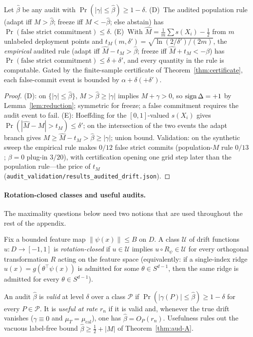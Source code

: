 \begin{theorem}\label{thm:aud-DE}
Let $\widehat\beta$ be any audit with $\Pr(|\gamma|\le\widehat\beta)\ge1-\delta$.
\textup{(D)}~The audited population rule (adapt iff $M>\widehat\beta$; freeze iff
$M<-\widehat\beta$; else abstain) has $\Pr(\text{false strict commitment})\le\delta$.
\textup{(E)}~With $\widehat M=\tfrac1m\sum s(X_i)-\tfrac12$ from $m$ unlabeled deployment
points and $t_M(m,\delta')=\sqrt{\ln(2/\delta')/(2m)}$, the \emph{empirical} audited rule
(adapt iff $\widehat M-t_M>\widehat\beta$; freeze iff $\widehat M+t_M<-\widehat\beta$) has
$\Pr(\text{false strict commitment})\le\delta+\delta'$, and every quantity in the rule is
computable. Gated by the finite-sample certificate of Theorem~\ref{thm:certificate}, each
false-commit event is bounded by $\alpha+\delta(+\delta')$.
\end{theorem}
\begin{proof}
(D): on $\{|\gamma|\le\widehat\beta\}$, $M>\widehat\beta\ge|\gamma|$ implies $M+\gamma>0$, so
$\operatorname{sign}\Delta=+1$ by Lemma~\ref{lem:reduction}; symmetric for freeze; a false commitment
requires the audit event to fail. (E): Hoeffding for the $[0,1]$-valued $s(X_i)$ gives
$\Pr(|\widehat M-M|>t_M)\le\delta'$; on the intersection of the two events the adapt branch
gives $M\ge\widehat M-t_M>\widehat\beta\ge|\gamma|$; union bound. Validation: on the synthetic
sweep the empirical rule makes $0/12$ false strict commits (population-$M$ rule $0/13$;
$\beta{=}0$ plug-in $3/20$), with certification opening one grid step later than the
population rule---the price of $t_M$
(\texttt{audit\_validation/results\_audited\_drift.json}).
\end{proof}

\paragraph{Rotation-closed classes and useful audits.}
The maximality questions below need two notions that are used throughout the rest of the
appendix.
\begin{definition}\label{def:rotation-closed}
Fix a bounded feature map $\|\psi(x)\|\le B$ on $D$. A class $\mathcal U$ of drift functions
$u:D\to[-1,1]$ is \emph{rotation-closed} if $u\in\mathcal U$ implies
$u\circ R_\psi\in\mathcal U$ for every orthogonal transformation $R$ acting on the feature
space (equivalently: if a single-index ridge $u(x)=g(\theta^\top\psi(x))$ is admitted for some
$\theta\in S^{d-1}$, then the same ridge is admitted for every $\theta\in S^{d-1}$).
\end{definition}
\begin{definition}\label{def:useful-audit}
An audit $\widehat\beta$ is \emph{valid} at level $\delta$ over a class $\mathcal P$ if
$\Pr(|\gamma(P)|\le\widehat\beta)\ge1-\delta$ for every $P\in\mathcal P$. It is
\emph{useful at rate $r_n$} if it is valid and, whenever the true drift vanishes
($\gamma\equiv0$ and $\mu_T=\mu_{\mathrm{cal}}$), one has $\widehat\beta=O_P(r_n)$.
Usefulness rules out the vacuous label-free bound $\widehat\beta\ge\tfrac12+|M|$ of
Theorem~\ref{thm:aud-A}.
\end{definition}

